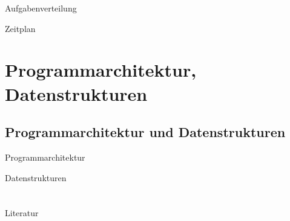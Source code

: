 \documentclass{beamer}
\begin{document}
\begin{frame}{Aufgabenverteilung}
\end{frame}

\begin{frame}{Zeitplan}
\end{frame}

\section{Programmarchitektur, Datenstrukturen}
\subsection[Programmarchitektur]{ Programmarchitektur und Datenstrukturen }

\begin{frame}{Programmarchitektur}
\end{frame}

\begin{frame}{Datenstrukturen}
\end{frame}

\section{}
\subsection[]{}



\begin{frame}{Literatur}
\end{frame}
\end{document}
